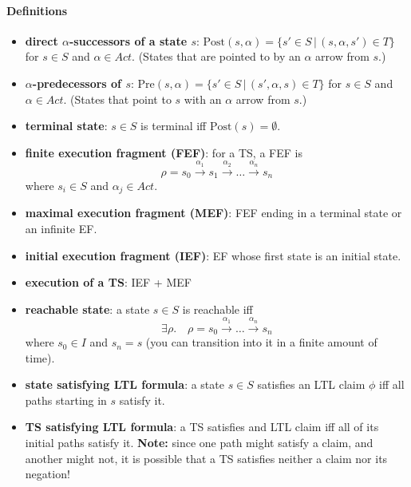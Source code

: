 \documentclass{article}
\begin{document}
\paragraph{Definitions}
\begin{itemize}
\item \textbf{direct $\alpha$-successors of a state $s$}: $\text{Post}(s, \alpha) = \{s'
  \in S\,|\,(s,\alpha,s') \in T\}$ for $s\in S$ and $\alpha \in Act$. (States
  that are pointed to by an $\alpha$ arrow from $s$.)

\item \textbf{$\alpha$-predecessors of $s$}: $\text{Pre}(s, \alpha) = \{s'
  \in S\,|\,(s',\alpha,s) \in T\}$ for $s\in S$ and $\alpha \in Act$. (States
  that point to $s$ with an $\alpha$ arrow from $s$.)

\item \textbf{terminal state}: $s \in S $ is terminal iff $\text{Post}(s) = \emptyset$.

\item \textbf{finite execution fragment (FEF)}: for a TS, a FEF is
  \[
    \rho = s_0 \xrightarrow{\alpha_1} s_1 \xrightarrow{\alpha_2} \hdots
    \xrightarrow{\alpha_n} s_n
  \]
  where $s_i \in S$ and $\alpha_j \in Act$.
\item \textbf{maximal execution fragment (MEF)}: FEF ending in a terminal state or an
  infinite EF.

\item \textbf{initial execution fragment (IEF)}: EF whose first state is an
  initial state.

\item \textbf{execution of a TS}: IEF + MEF

\item \textbf{reachable state}: a state $s \in S$ is reachable iff
  \[
    \exists \rho. \quad \rho = s_0 \xrightarrow{\alpha_1} \hdots
    \xrightarrow{\alpha_n} s_n
  \]
  where $s_0 \in I$ and $s_n = s$ (you can transition into it in a finite amount
  of time).
\item \textbf{state satisfying LTL formula}: a state $s \in S$ satisfies an LTL
  claim $\phi$ iff all paths starting in $s$ satisfy it.
\item \textbf{TS satisfying LTL formula}: a TS satisfies and LTL claim iff all
  of its initial paths satisfy it. \textbf{Note:} since one path might satisfy
  a claim, and another might not, it is possible that a TS satisfies neither a
  claim nor its negation!
\end{itemize}
\end{document}
